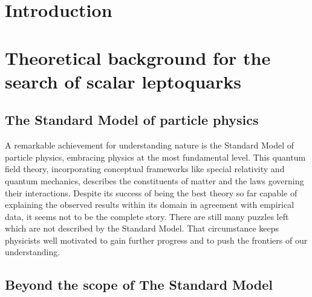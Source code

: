 \chapter{Introduction}
\chapter{Theoretical background for the search of scalar leptoquarks}\label{theory}
\section{The Standard Model of particle physics}\label{SM}
A remarkable achievement for understanding nature is the Standard Model of particle physics, embracing physics at the most fundamental level. This quantum field theory, incorporating conceptual frameworks like special relativity and quantum mechanics, describes the constituents of matter and the laws governing their interactions. \cite{Mann} Despite its success of being the best theory so far capable of explaining the observed results within its domain in agreement with empirical data, it seems not to be the complete story. There are still many puzzles left which are not described by the Standard Model. That circumstance keeps physicists well motivated to gain further progress and to push the frontiers of our understanding. \cite{Nair}\par
\section{Beyond the scope of The Standard Model}\label{beyondSM}
